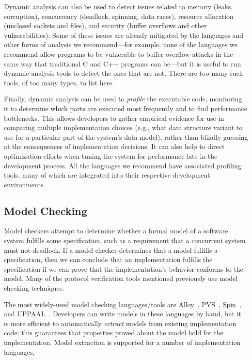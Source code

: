 Dynamic analysis can also be used to detect issues related to memory
(leaks, corruption), concurrency (deadlock, spinning, data races),
resource allocation (unclosed sockets and files), and security (buffer
overflows and other vulnerabilities). Some of these issues are already
mitigated by the languages and other forms of analysis we
recommend---for example, none of the languages we recommend allow
programs to be vulnerable to buffer overflow attacks in the same way
that traditional C and C++ programs can be---but it is useful to run
dynamic analysis tools to detect the ones that are not. There are too
many such tools, of too many types, to list here.

Finally, dynamic analysis can be used to \emph{profile} the executable
code, monitoring it to determine which parts are executed most
frequently and to find performance bottlenecks. This allows developers
to gather empirical evidence for use in comparing multiple
implementation choices (e.g., what data structure variant to use for a
particular part of the system's data model), rather than blindly
guessing at the consequences of implementation decisions. It can also
help to direct optimization efforts when tuning the system for
performance late in the development process. All the languages we
recommend have associated profiling tools, many of which are
integrated into their respective development environments.

\subsection{Model Checking}

Model checkers attempt to determine whether a formal model of a
software system fulfills some specification, such as a requirement
that a concurrent system must not deadlock. If a model checker
determines that a model fulfills a specification, then we can conclude
that an implementation fulfills the specification if we can prove that
the implementation's behavior conforms to the model. Many of the
protocol verification tools mentioned previously use model checking
techniques.

The most widely-used model checking languages/tools are
Alloy~\cite{Alloy}, PVS~\cite{PVS}, Spin~\cite{Spin}, and
UPPAAL~\cite{UPPAAL}. Developers can write models in these languages
by hand, but it is more efficient to automatically \emph{extract}
models from existing implementation code; this guarantees that
properties proved about the model hold for the implementation. Model
extraction is supported for a number of implementation languages,

